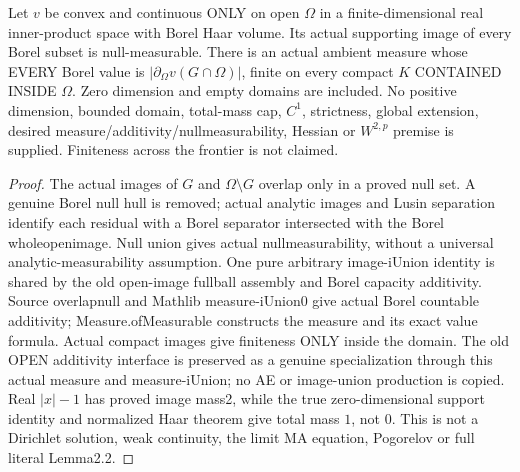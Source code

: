 \begin{lemma}
  \label{lem:domain-monge-ampere-measure}
  \leanok
  Let $v$ be convex and continuous ONLY on open $\Omega$ in a finite-dimensional
  real inner-product space with Borel Haar volume. Its actual supporting image
  of every Borel subset is null-measurable. There is an actual ambient measure
  whose EVERY Borel value is $|\partial_\Omega v(G\cap\Omega)|$, finite on
  every compact $K$ CONTAINED INSIDE $\Omega$. Zero dimension and empty domains
  are included. No positive dimension, bounded domain, total-mass cap, $C^1$,
  strictness, global extension, desired measure/additivity/nullmeasurability,
  Hessian or $W^{2,p}$ premise is supplied. Finiteness across the frontier is
  not claimed.
\end{lemma}
\begin{proof}
  \leanok
  The actual images of $G$ and $\Omega\setminus G$ overlap only in a proved
  null set. A genuine Borel null hull is removed; actual analytic images and
  Lusin separation identify each residual with a Borel separator intersected
  with the Borel wholeopenimage. Null union gives actual nullmeasurability,
  without a universal analytic-measurability assumption. One pure arbitrary
  image-iUnion identity is shared by the old open-image fullball assembly and
  Borel capacity additivity. Source overlapnull and Mathlib measure-iUnion0
  give actual Borel countable additivity; Measure.ofMeasurable constructs the
  measure and its exact value formula. Actual compact images give finiteness
  ONLY inside the domain. The old OPEN additivity interface is preserved as
  a genuine specialization through this actual measure and measure-iUnion;
  no AE or image-union production is copied. Real $|x|-1$ has proved image
  mass2, while the true zero-dimensional support identity and normalized Haar
  theorem give total mass $1$, not $0$. This is not a Dirichlet solution, weak
  continuity, the limit MA equation, Pogorelov or full literal Lemma2.2.
\end{proof}

